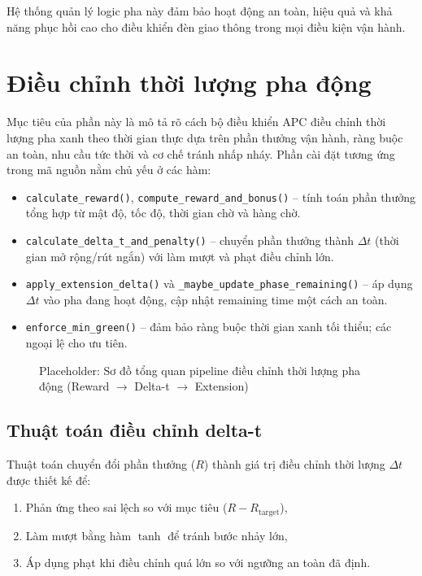 \documentclass[12pt,a4paper,oneside]{report}
\begin{document}
Hệ thống quản lý logic pha này đảm bảo hoạt động an toàn, hiệu quả và khả năng phục hồi cao cho điều khiển đèn giao thông trong mọi điều kiện vận hành.

\section{Điều chỉnh thời lượng pha động}

Mục tiêu của phần này là mô tả rõ cách bộ điều khiển APC điều chỉnh thời lượng pha xanh theo thời gian thực dựa trên phần thưởng vận hành, ràng buộc an toàn, nhu cầu tức thời và cơ chế tránh nhấp nháy. Phần cài đặt tương ứng trong mã nguồn nằm chủ yếu ở các hàm:
\begin{itemize}
    \item \texttt{calculate\_reward()}, \texttt{compute\_reward\_and\_bonus()} -- tính toán phần thưởng tổng hợp từ mật độ, tốc độ, thời gian chờ và hàng chờ.
    \item \texttt{calculate\_delta\_t\_and\_penalty()} -- chuyển phần thưởng thành \(\Delta t\) (thời gian mở rộng/rút ngắn) với làm mượt và phạt điều chỉnh lớn.
    \item \texttt{apply\_extension\_delta()} và \texttt{\_maybe\_update\_phase\_remaining()} -- áp dụng \(\Delta t\) vào pha đang hoạt động, cập nhật remaining time một cách an toàn.
    \item \texttt{enforce\_min\_green()} -- đảm bảo ràng buộc thời gian xanh tối thiểu; các ngoại lệ cho ưu tiên.
\end{itemize}

\begin{figure}[H]
    \centering
    \fbox{\rule[0pt]{0pt}{0.35\textwidth}\rule[0.8\textwidth]{0pt}{0pt}}
    \caption{Placeholder: Sơ đồ tổng quan pipeline điều chỉnh thời lượng pha động (Reward $\rightarrow$ Delta-t $\rightarrow$ Extension)}
    \label{fig:dynamic_timing_pipeline}
\end{figure}

\subsection{Thuật toán điều chỉnh delta-t}

Thuật toán chuyển đổi phần thưởng (\(R\)) thành giá trị điều chỉnh thời lượng \(\Delta t\) được thiết kế để:
\begin{enumerate}
    \item Phản ứng theo sai lệch so với mục tiêu (\(R - R_{\text{target}}\)),
    \item Làm mượt bằng hàm \(\tanh\) để tránh bước nhảy lớn,
    \item Áp dụng phạt khi điều chỉnh quá lớn so với ngưỡng an toàn đã định.
\end{enumerate}
\end{document}
